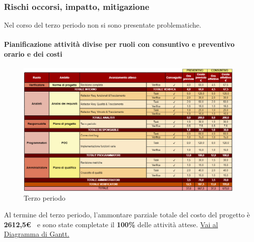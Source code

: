 \subsubsection*{Rischi occorsi, impatto, mitigazione} 

Nel corso del terzo periodo non si sono presentate problematiche.

\newpage
\paragraph{Pianificazione attività divise per ruoli con consuntivo e preventivo orario e dei costi}\hspace{1pt}

\begin{figure}[H]
    \centering
    \includegraphics[width=\linewidth, height=0.9\textheight, keepaspectratio]{../Images/periodo3.PNG}
    \caption{Terzo periodo}
    \label{fig:Terzo_periodo}
\end{figure}


Al termine del terzo periodo, l'ammontare parziale totale del costo del progetto è \textbf{ 2612,5\euro\ } e sono state completate il \textbf{100\%} delle attività attese.
\href{https://github.com/orgs/ByteOps-swe/projects/3/views/1?sortedBy%5Bdirection%5D=asc&sortedBy%5BcolumnId%5D=64182560}{Vai al Diagramma di Gantt.}\hspace{1pt}


